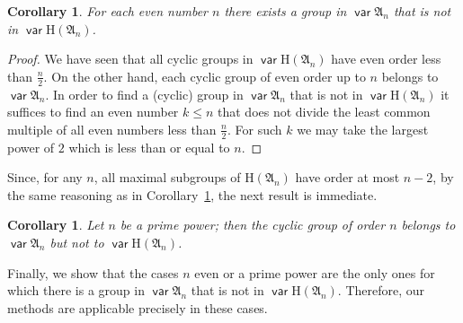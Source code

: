 \documentclass[preprint,1p,times]{elsarticle}
\DeclareMathOperator{\var}{\mathsf{var}}
\numberwithin{equation}{section}
\newtheorem{Cor}[Thm]{Corollary}
\theoremstyle{remark}
\def\H{\mathrm H}
\def\A{\mathfrak{A}}
\begin{document}
\begin{Cor}
\label{differenceofanandhan} For each even number $n$ there exists a group in $\var\A_n$ that is not in $\var\H(\A_n)$.
\end{Cor}

\begin{proof} We have seen that all cyclic groups in $\var\H(\A_n)$
have even order less than $\frac n2$. On the other hand, each cyclic group of even order up to $n$ belongs to
$\var\A_n$. In order to find a (cyclic) group in $\var\A_n$ that is not in $\var\H(\A_n)$ it suffices to find an even
number $k\le n$ that does not divide the least common multiple of all even numbers less than $\frac n 2$. For such $k$
we may take the largest power of $2$ which is less than or equal to $n$.
\end{proof}

Since, for any $n$, all maximal subgroups of $\H(\A_n)$ have order at most $n-2$, by the same reasoning as in
Corollary~\ref{differenceofanandhan}, the next result is immediate.

\begin{Cor}
\label{differenceofanandhanodd} Let $n$ be a prime power; then the cyclic group of order $n$ belongs to $\var\A_n$ but
not to $\var\H(\A_n)$.
\end{Cor}

Finally, we show that the cases $n$ even or a prime power are the only ones for which there is a group in $\var\A_n$
that is not in $\var\H(\A_n)$. Therefore, our methods are applicable precisely in these cases.
\end{document}
